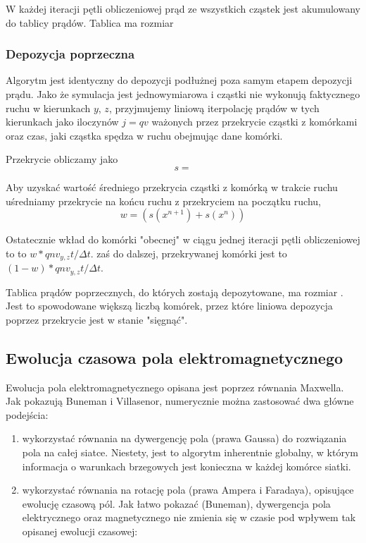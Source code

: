 W każdej iteracji pętli obliczeniowej prąd ze wszystkich cząstek jest
akumulowany do tablicy prądów. Tablica ma rozmiar  

\subsubsection{Depozycja poprzeczna}
Algorytm jest identyczny do depozycji podłużnej poza samym etapem depozycji
prądu. Jako że symulacja jest jednowymiarowa i cząstki nie wykonują
faktycznego ruchu w kierunkach $y$, $z$, przyjmujemy liniową iterpolację
prądów w tych kierunkach jako iloczynów $j=qv$ ważonych przez przekrycie
cząstki z komórkami oraz czas, jaki cząstka spędza w ruchu obejmując dane
komórki.

Przekrycie obliczamy jako
\begin{equation}
    s =
\end{equation}

Aby uzyskać wartość średniego przekrycia cząstki z komórką w trakcie ruchu
uśredniamy przekrycie na końcu ruchu z przekryciem na początku ruchu,
\begin{equation}
    w = {(s(x^{n+1}) + s(x^n))}
\end{equation}

Ostatecznie wkład do komórki "obecnej" w ciągu jednej iteracji pętli obliczeniowej to 
to $w * q n v_{y, z} t / \Delta t$.
zaś do dalszej, przekrywanej komórki jest to  $(1-w) * q n v_{y, z} t / \Delta t$.

Tablica prądów poprzecznych, do których zostają depozytowane, ma rozmiar
. Jest to spowodowane większą liczbą komórek, przez które liniowa depozycja
poprzez przekrycie jest w stanie "sięgnąć".



\subsection{Ewolucja czasowa pola elektromagnetycznego} 

Ewolucja pola elektromagnetycznego opisana jest poprzez równania Maxwella.
Jak pokazują Buneman i Villasenor, numerycznie można zastosować dwa główne
podejścia: 

\begin{enumerate}
    \item wykorzystać równania na dywergencję pola (prawa Gaussa) do
    rozwiązania pola na całej siatce. Niestety, jest to algorytm
    inherentnie globalny, w którym informacja o warunkach brzegowych
    jest konieczna w każdej komórce siatki.

    \item wykorzystać równania na rotację pola (prawa Ampera i Faradaya),
    opisujące ewolucję czasową pól. Jak łatwo pokazać (Buneman), dywergencja
    pola elektrycznego oraz magnetycznego nie zmienia się w czasie pod
    wpływem tak opisanej ewolucji czasowej:
\end{enumerate}

